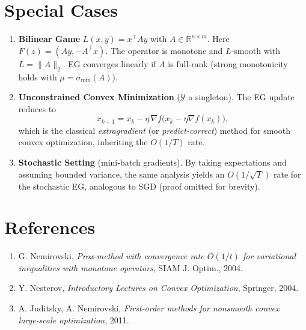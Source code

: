 \documentclass{article}
\begin{document}
\section{Special Cases}
\begin{enumerate}[leftmargin=*]
\item \textbf{Bilinear Game} $L(x,y)=x^{\top}Ay$ with $A\in\mathbb{R}^{n\times m}$. Here $F(z)=(Ay,-A^{\top}x)$. The operator is monotone and $L$‑smooth with $L=\|A\|_{2}$. EG converges linearly if $A$ is full‑rank (strong monotonicity holds with $\mu=\sigma_{\min}(A)$).

\item \textbf{Unconstrained Convex Minimization} ($\mathcal{Y}$ a singleton). The EG update reduces to
\[
x_{k+1}=x_{k}-\eta\,\nabla f\bigl(x_{k}-\eta\nabla f(x_{k})\bigr),
\]
which is the classical \emph{extragradient} (or \emph{predict‑correct}) method for smooth convex optimization, inheriting the $O(1/T)$ rate.

\item \textbf{Stochastic Setting} (mini‑batch gradients). By taking expectations and assuming bounded variance, the same analysis yields an $O(1/\sqrt{T})$ rate for the stochastic EG, analogous to SGD (proof omitted for brevity).
\end{enumerate}

\section*{References}
\begin{enumerate}
\item G. Nemirovski, \emph{Prox‑method with convergence rate $O(1/t)$ for variational inequalities with monotone operators}, SIAM J. Optim., 2004.
\item Y. Nesterov, \emph{Introductory Lectures on Convex Optimization}, Springer, 2004.
\item A. Juditsky, A. Nemirovski, \emph{First‑order methods for nonsmooth convex large‑scale optimization}, 2011.
\end{enumerate}
\end{document}

